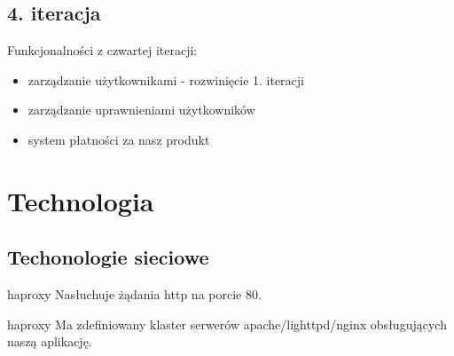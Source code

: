\documentclass{beamer}
\begin{document}
\subsection{4. iteracja}
  \begin{frame}
      Funkcjonalności z czwartej iteracji:
    \begin{itemize}
      \item zarządzanie użytkownikami - rozwinięcie 1. iteracji
      \item zarządzanie uprawnieniami użytkowników
      \item system płatności za nasz produkt
    \end{itemize}
  \end{frame}
\section{Technologia}
\subsection{Techonologie sieciowe}
  \begin{frame}
    \begin{block}{haproxy}
      Nasłuchuje żądania http na porcie 80.
    \end{block}
  \end{frame}
  \begin{frame}
    \begin{block}{haproxy}
      Ma zdefiniowany klaster serwerów apache/lighttpd/nginx obsługujących naszą aplikację.
    \end{block}
  \end{frame}
\end{document}
